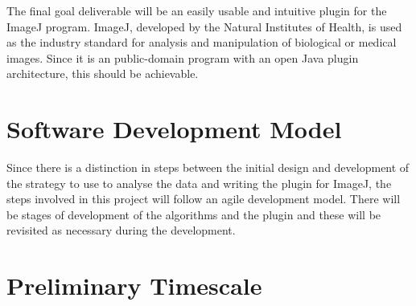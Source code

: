 The final goal deliverable will be an easily usable and intuitive plugin for
the ImageJ program. ImageJ\cite{rasband1997imagej}, developed by the Natural
Institutes of Health, is used as the industry standard for analysis and
manipulation of biological or medical images. Since it is an public-domain
program with an open Java plugin architecture, this should be achievable.

\section{Software Development Model}
\label{sec:software_development_model}

Since there is a distinction in steps between the initial design and development
of the strategy to use to analyse the data and writing the plugin for ImageJ,
the steps involved in this project will follow an agile development model.
There will be stages of development of the algorithms and the plugin and these
will be revisited as necessary during the development.

\section{Preliminary Timescale}
\label{sec:preliminary_timescale}

